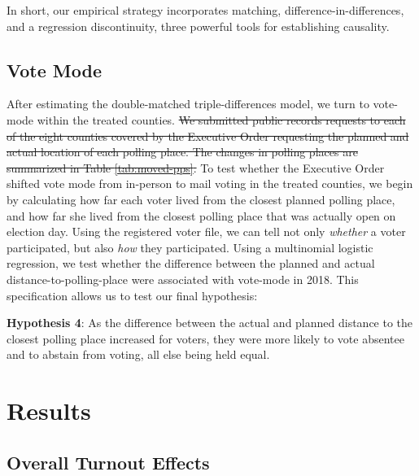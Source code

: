 \documentclass[
  12pt,
]{article}
\begin{document}
In short, our empirical strategy incorporates matching, difference-in-differences, and a regression discontinuity, three powerful tools for establishing causality.

\hypertarget{vote-mode}{%
\subsection*{Vote Mode}\label{vote-mode}}

After estimating the double-matched triple-differences model, we turn to vote-mode within the treated counties. \sout{We submitted public records requests to each of the eight counties covered by the Executive Order requesting the planned and actual location of each polling place. The changes in polling places are summarized in Table \ref{tab:moved-pps}.} To test whether the Executive Order shifted vote mode from in-person to mail voting in the treated counties, we begin by calculating how far each voter lived from the closest planned polling place, and how far she lived from the closest polling place that was actually open on election day. Using the registered voter file, we can tell not only \emph{whether} a voter participated, but also \emph{how} they participated. Using a multinomial logistic regression, we test whether the difference between the planned and actual distance-to-polling-place were associated with vote-mode in 2018. This specification allows us to test our final hypothesis:

\textbf{Hypothesis 4}: As the difference between the actual and planned distance to the closest polling place increased for voters, they were more likely to vote absentee and to abstain from voting, all else being held equal.

\hypertarget{results}{%
\section*{Results}\label{results}}

\hypertarget{overall-turnout-effects}{%
\subsection*{Overall Turnout Effects}\label{overall-turnout-effects}}
\end{document}

